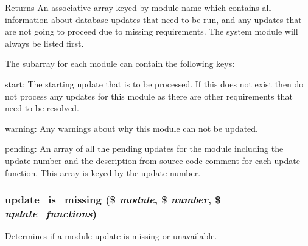 \begin{DoxyReturn}{Returns}
An associative array keyed by module name which contains all information about database updates that need to be run, and any updates that are not going to proceed due to missing requirements. The system module will always be listed first.
\end{DoxyReturn}
The subarray for each module can contain the following keys:
\begin{DoxyItemize}
\item start: The starting update that is to be processed. If this does not exist then do not process any updates for this module as there are other requirements that need to be resolved.
\item warning: Any warnings about why this module can not be updated.
\item pending: An array of all the pending updates for the module including the update number and the description from source code comment for each update function. This array is keyed by the update number. 
\end{DoxyItemize}\hypertarget{update_8inc_ab41c0d635b6a220d269146f778a6a245}{
\subsubsection[{update\_\-is\_\-missing}]{\setlength{\rightskip}{0pt plus 5cm}update\_\-is\_\-missing (\$ {\em module}, \/  \$ {\em number}, \/  \$ {\em update\_\-functions})}}
\label{update_8inc_ab41c0d635b6a220d269146f778a6a245}
Determines if a module update is missing or unavailable.


